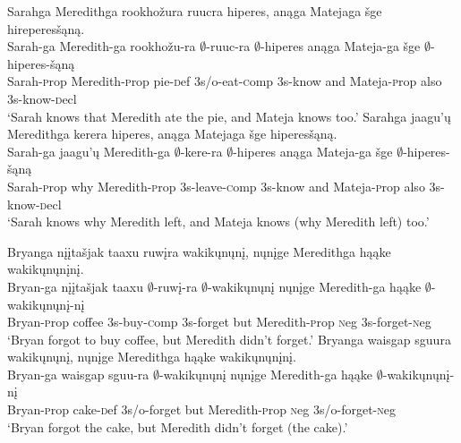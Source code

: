 \documentclass[output=paper]{LSP/langsci}
\begin{document}
\begin{exe}
\ex
\begin{xlist}
\ex
\glll Sarahga Meredithga rookho\v{z}ura ruucra hiperes, an\k{a}ga Matejaga \v{s}ge hireperes\v{s}\k{a}n\k{a}.\\
Sarah-ga Meredith-ga rookho\v{z}u-ra $\emptyset$-ruuc-ra $\emptyset$-hiperes an\k{a}ga Mateja-ga \v{s}ge $\emptyset$-hiperes-\v{s}\k{a}n\k{a}\\
Sarah-{\textsc prop} Meredith-{\textsc prop} pie-{\textsc def} {\textsc 3s/o}-eat-{\textsc comp} {\textsc 3s}-know and Mateja-{\textsc prop} also {\textsc 3s}-know-{\textsc decl}\\
\trans `Sarah knows that Meredith ate the pie, and Mateja knows too.'
\ex
\glll Sarahga jaagu'\k{u} Meredithga kerera hiperes, an\k{a}ga Matejaga \v{s}ge hiperes\v{s}\k{a}n\k{a}.\\
Sarah-ga jaagu'\k{u} Meredith-ga $\emptyset$-kere-ra $\emptyset$-hiperes an\k{a}ga Mateja-ga \v{s}ge $\emptyset$-hiperes-\v{s}\k{a}n\k{a}\\
Sarah-{\textsc prop} why Meredith-{\textsc prop} {\textsc 3s}-leave-{\textsc comp} {\textsc 3s}-know and Mateja-{\textsc prop} also {\textsc 3s}-know-{\textsc decl}\\
\trans `Sarah knows why Meredith left, and Mateja knows (why Meredith left) too.'
\end{xlist}
\end{exe}

\begin{exe}
\ex
\begin{xlist}
\ex
\glll Bryanga {n\k{i}\k{i}ta\v{s}jak taaxu} ruw\k{i}ra wakik\k{u}n\k{u}n\k{i}, n\k{u}n\k{i}ge Meredithga h\k{a}\k{a}ke wakik\k{u}n\k{u}n\k{i}n\k{i}.\\
Bryan-ga {n\k{i}\k{i}ta\v{s}jak taaxu} $\emptyset$-ruw\k{i}-ra $\emptyset$-wakik\k{u}n\k{u}n\k{i} n\k{u}n\k{i}ge Meredith-ga h\k{a}\k{a}ke $\emptyset$-wakik\k{u}n\k{u}n\k{i}-n\k{i}\\
Bryan-{\textsc prop} coffee {\textsc 3s}-buy-{\textsc comp} {\textsc 3s}-forget but Meredith-{\textsc prop} {\textsc neg} {\textsc 3s}-forget-{\textsc neg}\\
\trans `Bryan forgot to buy coffee, but Meredith didn't forget.'
\ex
\glll Bryanga {waisgap sguura} wakik\k{u}n\k{u}n\k{i}, n\k{u}n\k{i}ge Meredithga h\k{a}\k{a}ke wakik\k{u}n\k{u}n\k{i}n\k{i}.\\
Bryan-ga {waisgap sguu-ra} $\emptyset$-wakik\k{u}n\k{u}n\k{i} n\k{u}n\k{i}ge Meredith-ga h\k{a}\k{a}ke $\emptyset$-wakik\k{u}n\k{u}n\k{i}-n\k{i}\\
Bryan-{\textsc prop} cake-{\textsc def} {\textsc 3s/o}-forget but Meredith-{\textsc prop} {\textsc neg} {\textsc 3s/o}-forget-{\textsc neg}\\
\trans `Bryan forgot the cake, but Meredith didn't forget (the cake).'
\end{xlist}
\end{exe}
\end{document}
